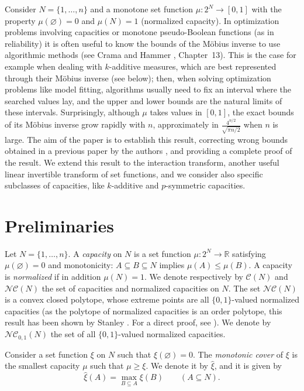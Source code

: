 \documentclass[12pt,a4paper]{article}
\theoremstyle{definition}
\theoremstyle{remark}
\def \RR {\mathbb{R}}
\def \C {\mathscr{C}}
\def \NC {\mathscr{NC}}
\begin{document}
Consider $N=\{1,\ldots,n\}$ and a monotone set function
$\mu:2^{N}\rightarrow[0,1]$ with the property $\mu(\varnothing)=0$ and
$\mu(N)=1$ (normalized capacity).  In optimization problems involving capacities
or monotone pseudo-Boolean functions (as in reliability) it is often
useful to know the bounds of the M\"obius inverse to use algorithmic
  methods (see Crama and Hammer \cite{crha11}, Chapter~13). This is the case
for example when dealing with $k$-additive measures, which are best represented
through their M\"obius inverse (see below); then, when solving optimization
problems like model fitting, algorithms usually need to fix an interval where
the searched values lay, and the upper and lower bounds are the natural limits
of these intervals. Surprisingly, although $\mu$ takes values in $[0,1]$, the
exact bounds of its M\"obius inverse grow rapidly with $n$, approximately in
$\frac{4^{n/2}}{\sqrt{\pi n/2}}$ when $n$ is large. The aim of the paper is to
establish this result, correcting wrong bounds obtained in a previous paper by
the authors \cite{migr99a}, and providing a complete proof of the result. We
extend this result to the interaction transform, another useful linear
invertible transform of set functions, and we consider also specific subclasses
of capacities, like $k$-additive and $p$-symmetric capacities.

\section{Preliminaries}
Let $N=\{1,\ldots,n\}$. A \textit{capacity} on $N$ is a set function
$\mu:2^{N}\rightarrow \RR$ satisfying $\mu(\varnothing)=0$ and monotonicity:
$A\subseteq B\subseteq N$ implies $\mu(A)\leqslant \mu(B)$. A capacity is
\textit{normalized} if in addition $\mu(N)=1$. We denote respectively by $\C(N)$
and $\NC(N)$ the set of capacities and normalized capacities on $N$. The set
$\NC(N)$ is a convex closed polytope, whose extreme points are all
$\{0,1\}$-valued normalized capacities (as the polytope of normalized capacities
is an order polytope, this result has been shown by Stanley \cite{sta86}. For a
direct proof, see \cite{rad98}). We denote by
$\NC_{0,1}(N)$ the set of all $\{0,1\}$-valued normalized capacities.

Consider a set function $\xi$ on $N$ such that $\xi(\varnothing)=0$. The
\textit{monotonic cover} of $\xi$ is the smallest capacity $\mu$ such that
$\mu\geqslant \xi$. We denote it by $\widehat{\xi}$, and it is given by
\begin{equation}\label{eq:mc}
\widehat{\xi}(A) = \max_{B\subseteq A}\xi(B)\qquad (A\subseteq N).
\end{equation}
\end{document}
